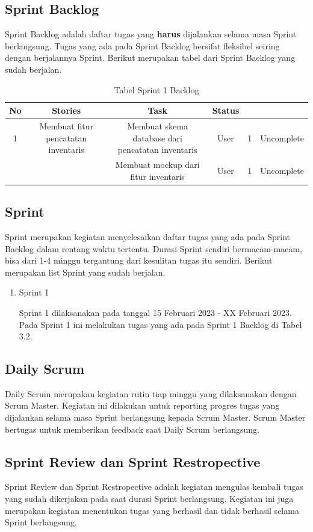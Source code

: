 \subsection{Sprint Backlog}

Sprint Backlog adalah daftar tugas yang \textbf{harus} dijalankan selama masa Sprint berlangsung. Tugas yang ada pada Sprint Backlog bersifat fleksibel seiring dengan berjalannya Sprint. Berikut merupakan tabel dari Sprint Backlog yang sudah berjalan.

\begin{table}[H]	
	\begin{center}
		\caption{Tabel Sprint 1 Backlog}
		\label{tab:table6}
		\begin{tabular}{|c|c|c|c|c|c|}
		\hline
		\textbf{No} & \textbf{Stories} & \textbf{Task} & \textbf{Status} \\
		\hline
		1 & Membuat fitur pencatatan inventaris & Membuat skema database dari pencatatan inventaris & User & 1 & Uncomplete \\
		 &  & Membuat mockup dari fitur inventaris & User & 1 & Uncomplete \\
		\hline
		\end{tabular}
	\end{center}
\end{table}

\subsection{Sprint}

Sprint merupakan kegiatan menyelesaikan daftar tugas yang ada pada Sprint Backlog dalam rentang waktu tertentu. Durasi Sprint sendiri bermacam-macam, bisa dari 1-4 minggu tergantung dari kesulitan tugas itu sendiri. Berikut merupakan list Sprint yang sudah berjalan.

\begin{enumerate}
	\item Sprint 1
	
	Sprint 1 dilaksanakan pada tanggal 15 Februari 2023 - XX Februari 2023. Pada Sprint 1 ini melakukan tugas yang ada pada Sprint 1 Backlog di Tabel 3.2.
\end{enumerate}

\subsection{Daily Scrum}

Daily Scrum merupakan kegiatan rutin tiap minggu yang dilaksanakan dengan Scrum Master. Kegiatan ini dilakukan untuk reporting progres tugas yang dijalankan selama masa Sprint berlangsung kepada Scrum Master. Scrum Master bertugas untuk memberikan feedback saat Daily Scrum berlangsung.

\subsection{Sprint Review dan Sprint Restropective}

Sprint Review dan Sprint Restropective adalah kegiatan mengulas kembali tugas yang sudah dikerjakan pada saat durasi Sprint berlangsung. Kegiatan ini juga merupakan kegiatan menentukan tugas yang berhasil dan tidak berhasil selama Sprint berlangsung.